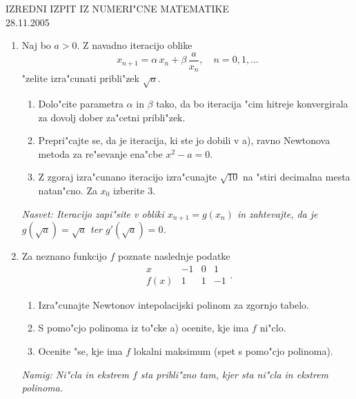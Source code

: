 \documentclass[12pt,a4paper]{article}
\begin{document}
\begin{center}
  {\large IZREDNI IZPIT IZ NUMERI"CNE MATEMATIKE\\
    28.11.2005}
\end{center}
\vspace{1.5cm}
\begin{enumerate}
  \item Naj bo $a>0$. Z navadno iteracijo oblike
    $$x_{n+1}=\alpha\,x_n+\beta\,\frac{a}{x_n},\quad n=0,1,\dots$$
    "zelite izra"cunati pribli"zek $\sqrt{a}$. 

  \begin{enumerate}
    \item Dolo"cite parametra 
    $\alpha$ in $\beta$ tako, da bo iteracija "cim hitreje
    konvergirala za dovolj dober za"cetni pribli"zek.

    \item Prepri"cajte se, da je iteracija, ki ste jo dobili v a),
      ravno Newtonova metoda za re"sevanje ena"cbe $x^2-a=0$.

    \item Z zgoraj izra"cunano iteracijo izra"cunajte
      $\sqrt{10}$ na "stiri decimalna mesta natan"cno. Za $x_0$ izberite
      $3$.

  \end{enumerate}
  {\sl Nasvet: Iteracijo zapi"site v obliki $x_{n+1}=g(x_n)$ in
    zahtevajte, da je $g(\sqrt{a})=\sqrt{a}$ ter $g'(\sqrt{a})=0$.}
  \item Za neznano funkcijo $f$ poznate naslednje podatke
    $$
    \begin{array}{c|rrr}
      x& -1 & 0 & 1 \\ \hline
      f(x) & 1 & 1 & -1
    \end{array}.
    $$
      

  \begin{enumerate}
    \item Izra"cunajte Newtonov intepolacijski polinom 
      za zgornjo tabelo.

    \item S pomo"cjo polinoma iz to"cke a) ocenite, kje ima $f$ ni"clo. 

    \item Ocenite "se, kje ima $f$ lokalni maksimum (spet
      s pomo"cjo polinoma).

  \end{enumerate}
  {\sl Namig: Ni"cla in ekstrem $f$ sta pribli"zno tam, kjer sta 
    ni"cla in ekstrem polinoma.}
\end{enumerate}
\end{document}

